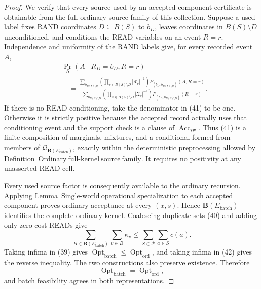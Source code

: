 \documentclass{article}
\begin{document}
\begin{proof}
We verify that every source used by an accepted component certificate is obtainable from the full ordinary source family of this collection.  Suppose a used label fixes RAND coordinates \(D\subseteq B(S)\) to \(b_D\), leaves coordinates in \(B(S)\setminus D\) unconditioned, and conditions the READ variables on an event \(R=r\).  Independence and uniformity of the RAND labels give, for every recorded event \(A\),
\[
\begin{aligned}
 &\Pr_S(A\mid R_D=b_D,R=r)\\
 &\quad=
 \frac{\displaystyle
  \sum_{b_{B(S)\setminus D}}
  \left(\prod_{v\in B(S)\setminus D}|\mathfrak X_v|^{-1}\right)
  P_{(b_D,b_{B(S)\setminus D})}(A,R=r)}
 {\displaystyle
  \sum_{b_{B(S)\setminus D}}
  \left(\prod_{v\in B(S)\setminus D}|\mathfrak X_v|^{-1}\right)
  P_{(b_D,b_{B(S)\setminus D})}(R=r)}.
\end{aligned}
\tag{41}
\]
If there is no READ conditioning, take the denominator in (41) to be one.  Otherwise it is strictly positive because the accepted record actually uses that conditioning event and the support check is a clause of \(\operatorname{Acc}_{\mathrm{sw}}\).  Thus (41) is a finite composition of marginals, mixtures, and a conditional formed from members of
\(\mathcal Q_{\mathbf B(E_{\mathrm{batch}})}\), exactly within the deterministic preprocessing allowed by Definition~\(\mathrm{Ordinary\ full\mbox{-}kernel\ source\ family}\).  It requires no positivity at any unasserted READ cell.

Every used source factor is consequently available to the ordinary recursion.  Applying Lemma~\(\mathrm{Single\mbox{-}world\ operational\ specialization}\) to each accepted component proves ordinary acceptance at every \((x,s)\).  Hence \(\mathbf B(E_{\mathrm{batch}})\) identifies the complete ordinary kernel.  Coalescing duplicate sets (40) and adding only zero-cost READs give
\[
 \sum_{B\in\mathbf B(E_{\mathrm{batch}})}\sum_{v\in B}\kappa_v
 \leq \sum_{S\in\mathcal P}\sum_{a\in S}c(a).
 \tag{42}
\]
Taking infima in (39) gives
\(\operatorname{Opt}_{\mathrm{batch}}\leq\operatorname{Opt}_{\mathrm{ord}}\),
and taking infima in (42) gives the reverse inequality.  The two constructions also preserve existence.  Therefore
\[
 \operatorname{Opt}_{\mathrm{batch}}=\operatorname{Opt}_{\mathrm{ord}},
 \tag{43}
\]
and batch feasibility agrees in both representations.


\end{proof}
\end{document}
